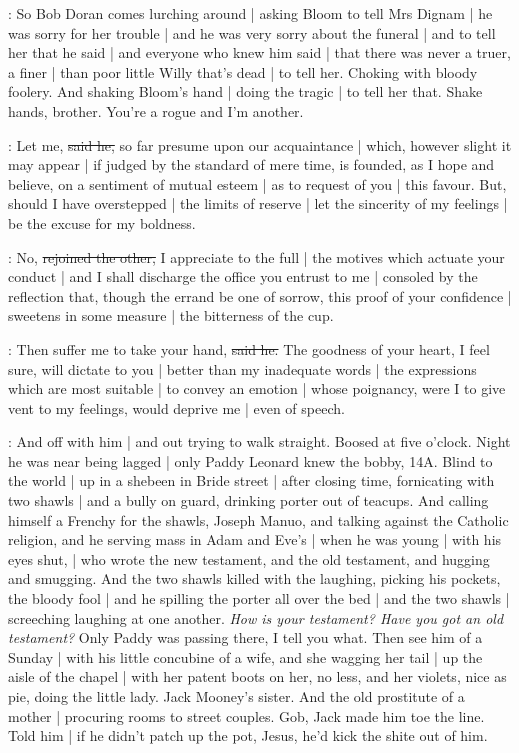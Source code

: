 \Nq:
So Bob Doran comes lurching around
 |
asking Bloom to tell Mrs Dignam |
he was sorry for her trouble |
and he was very sorry about the funeral |
and to tell her that he said |
and everyone who knew him said |
that there was never a truer,
a finer |
than poor little Willy that's dead |
to tell her.
Choking with bloody foolery.
And shaking Bloom's hand |
doing the tragic |
to tell her that.
Shake hands,
brother.
You're a rogue and I'm another.

\doran:
Let me,
\sout{said he,}
so far presume upon our acquaintance |
which,
however slight it may appear |
if judged by the standard of mere time,
is founded,
as I hope and believe,
on a sentiment of mutual esteem |
as to request of you |
this favour.
But,
should I have overstepped |
the limits of reserve |
let the sincerity of my feelings
 |
be the excuse for my boldness.

\Bloom:
No,
\sout{rejoined the other,}
I appreciate to the full |
the motives which actuate your conduct |
and I shall discharge the office you entrust to me |
consoled by the reflection that,
though the errand be one of sorrow,
this proof of your confidence |
sweetens in some measure |
the bitterness of the cup.

\doran:
Then suffer me to take your hand,
\sout{said he.}
The goodness of your heart,
I feel sure,
will dictate to you |
better than my inadequate words |
the expressions which are most suitable |
to convey an emotion |
whose poignancy,
were I to give vent to my feelings,
would deprive me |
even of speech.

\Nq:
And off with him |
and out trying to walk straight.
Boosed at five o'clock.
Night he was near being lagged |
only Paddy Leonard knew the bobby,
14A.
Blind to the world |
up in a shebeen in Bride street |
after closing time,
fornicating with two shawls |
and a bully on guard,
drinking porter out of teacups.
And calling himself a Frenchy for the shawls,
Joseph Manuo,
and talking against the Catholic religion,
and he serving mass in Adam and Eve's |
when he was young |
with his eyes shut, |
who wrote the new testament,
and the old testament,
and hugging and smugging.
And the two shawls killed with the laughing,
picking his pockets,
the bloody fool |
and he spilling the porter all over the bed |
and the two shawls |
screeching laughing at one another.%
\emph{How is your testament?
Have you got an old testament?}
Only Paddy was passing there,
I tell you what.
Then see him of a Sunday |
with his little concubine of a wife,
and she wagging her tail |
up the aisle of the chapel |
with her patent boots on her,
no less,
and her violets,
nice as pie,
doing the little lady.
Jack Mooney's sister.
And the old prostitute of a mother |
procuring rooms to street couples.
Gob,
Jack made him toe the line.
Told him |
if he didn't patch up the pot,
Jesus,
he'd kick the shite out of him.

